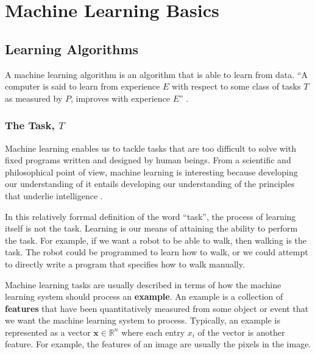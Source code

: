 \section{Machine Learning Basics}
\subsection{Learning Algorithms}
A machine learning algorithm is an algorithm that is able to learn from data.
``A computer is said to learn from experience $E$ with respect to some class of
tasks $T$ as measured by $P$, improves with experience $E$''
\cite{mitchell1997machine}.
\subsubsection{The Task, $T$}
Machine learning enables us to tackle tasks that are too difficult to solve
with fixed programs written and designed by human beings. From a scientific
and philosophical point of view, machine learning is interesting because
developing our understanding of it entails developing our understanding of
the principles that underlie intelligence \cite{Goodfellow-et-al-2016}.


In this relatively forrmal definition of the word ``task'', the process of
learning itself is not the task. Learning is our means of attaining the ability
to perform the task. For example, if we want a robot to be able to walk, then
walking is the task. The robot could be programmed to learn how to walk, or we
could attempt to directly write a program that specifies how to walk manually.


Machine learning tasks are usually described in terms of how the machine
learning system should process an \textbf{example}. An example is a
collection of \textbf{features} that have been quantitatively measured from
some object or event that we want the machine learning system to process.
Typically, an example is represented as a vector $\boldsymbol{x}\in\mathbb{R}^n$
where each entry $x_i$ of the vector is another feature. For example, the
features of an image are usually the pixels in the image.


